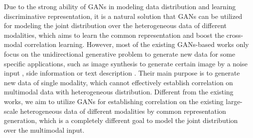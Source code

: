 \documentclass[journal]{IEEEtran}
\begin{document}
Due to the strong ability of GANs in modeling data distribution and learning discriminative representation, it is a natural solution that GANs can be utilized for modeling the joint distribution over the heterogeneous data of different modalities, which aims to learn the common representation and boost the cross-modal correlation learning.
However, most of the existing GANs-based works only focus on the unidirectional generative problem to generate new data for some specific applications, 
such as image synthesis to generate certain image by a noise input \cite{radford2015unsupervised}, side information \cite{mirza2014conditional} or text description \cite{reed2016generative}. Their main purpose is to generate new data of single modality, which cannot effectively establish correlation on multimodal data with heterogeneous distribution. 
Different from the existing works, we aim to utilize GANs for establishing correlation on the existing large-scale heterogeneous data of different modalities by common representation generation, which is a completely different goal to model the joint distribution over the multimodal input.
\end{document}

